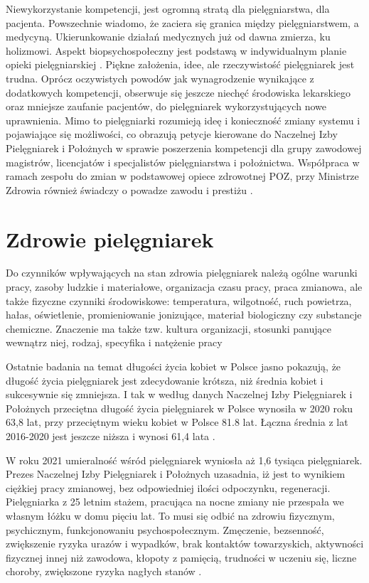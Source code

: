 \documentclass[a4paper,12pt,twoside,openany]{report}
\begin{document}
Niewykorzystanie  kompetencji, jest ogromną stratą dla pielęgniarstwa, dla pacjenta. Powszechnie wiadomo, że zaciera się granica między pielęgniarstwem, a medycyną. Ukierunkowanie działań medycznych już od dawna zmierza, ku holizmowi. Aspekt biopsychospołeczny jest podstawą w indywidualnym planie opieki pielęgniarskiej \cite{dorota}. Piękne założenia, idee, ale rzeczywistość pielęgniarek jest trudna. Oprócz oczywistych powodów jak wynagrodzenie wynikające z dodatkowych kompetencji, obserwuje się jeszcze niechęć środowiska lekarskiego oraz mniejsze zaufanie pacjentów, do pielęgniarek wykorzystujących nowe uprawnienia. Mimo to pielęgniarki rozumieją ideę i konieczność zmiany systemu i  pojawiające się możliwości, co obrazują petycje kierowane do Naczelnej Izby Pielęgniarek i Położnych w sprawie poszerzenia kompetencji dla grupy zawodowej magistrów, licencjatów i specjalistów pielęgniarstwa i położnictwa\cite{petycja}. Współpraca w ramach zespołu do zmian w podstawowej opiece zdrowotnej POZ, przy Ministrze Zdrowia również świadczy o powadze zawodu i prestiżu \cite{poz}.

\section{Zdrowie pielęgniarek}
\label{sectionZdrowiePielegniarek}
Do czynników wpływających na stan zdrowia pielęgniarek należą ogólne warunki pracy, zasoby ludzkie i materiałowe, organizacja czasu pracy,  praca zmianowa, ale także fizyczne czynniki środowiskowe: temperatura, wilgotność, ruch powietrza, hałas, oświetlenie, promieniowanie jonizujące, materiał biologiczny czy substancje chemiczne. Znaczenie ma także tzw. kultura organizacji, stosunki panujące wewnątrz niej, rodzaj, specyfika i natężenie pracy \cite{obciazenia}

Ostatnie badania na temat długości życia kobiet w Polsce jasno pokazują, że długość życia pielęgniarek jest zdecydowanie krótsza, niż średnia kobiet i sukcesywnie się zmniejsza. I tak w według danych Naczelnej Izby Pielęgniarek i Położnych przeciętna długość życia pielęgniarek w Polsce wynosiła w 2020 roku 63,8 lat, przy przeciętnym wieku kobiet w Polsce 81.8 lat. Łączna średnia z lat 2016-2020 jest jeszcze niższa i wynosi 61,4 lata \cite{statystyka}.

W roku 2021 umieralność wśród pielęgniarek wyniosła aż 1,6 tysiąca pielęgniarek. Prezes Naczelnej Izby Pielęgniarek i Położnych uzasadnia, iż jest to wynikiem ciężkiej pracy zmianowej, bez odpowiedniej ilości odpoczynku, regeneracji. Pielęgniarka z 25 letnim stażem, pracująca na nocne zmiany nie przespała we własnym łóżku w domu pięciu lat. To musi się odbić na zdrowiu fizycznym, psychicznym, funkcjonowaniu psychospołecznym. Zmęczenie, bezsenność, zwiększenie ryzyka urazów i wypadków, brak kontaktów towarzyskich, aktywności fizycznej innej niż zawodowa, kłopoty z pamięcią, trudności w uczeniu się, liczne choroby, zwiększone ryzyka nagłych stanów \cite{zgony}.
\end{document}
